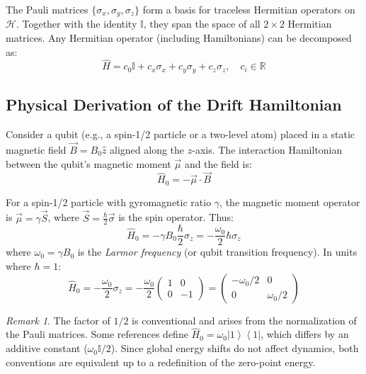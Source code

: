 \documentclass[11pt,a4paper]{article}
\theoremstyle{definition}
\theoremstyle{remark}
\newtheorem{remark}{Remark}[section]
\newcommand{\ket}[1]{\left|#1\right\rangle}
\newcommand{\bra}[1]{\left\langle#1\right|}
\newcommand{\paulix}{\sigma_x}
\newcommand{\pauliy}{\sigma_y}
\newcommand{\pauliz}{\sigma_z}
\newcommand{\identity}{\mathbb{I}}
\newcommand{\hilbert}{\mathcal{H}}
\newcommand{\RR}{\mathbb{R}}
\begin{document}
The Pauli matrices $\{\paulix, \pauliy, \pauliz\}$ form a basis for traceless Hermitian operators on $\hilbert$. Together with the identity $\identity$, they span the space of all $2 \times 2$ Hermitian matrices. Any Hermitian operator (including Hamiltonians) can be decomposed as:
\begin{equation}
\hat{H} = c_0 \identity + c_x \paulix + c_y \pauliy + c_z \pauliz, \quad c_i \in \RR
\end{equation}

\subsection{Physical Derivation of the Drift Hamiltonian}

Consider a qubit (e.g., a spin-1/2 particle or a two-level atom) placed in a static magnetic field $\vec{B} = B_0 \hat{z}$ aligned along the $z$-axis. The interaction Hamiltonian between the qubit's magnetic moment $\vec{\mu}$ and the field is:
\begin{equation}
\hat{H}_0 = -\vec{\mu} \cdot \vec{B}
\end{equation}

For a spin-1/2 particle with gyromagnetic ratio $\gamma$, the magnetic moment operator is $\vec{\mu} = \gamma \vec{S}$, where $\vec{S} = \frac{\hbar}{2} \vec{\sigma}$ is the spin operator. Thus:
\begin{equation}
\hat{H}_0 = -\gamma B_0 \frac{\hbar}{2} \sigma_z = -\frac{\omega_0}{2} \hbar \sigma_z
\end{equation}
where $\omega_0 = \gamma B_0$ is the \emph{Larmor frequency} (or qubit transition frequency). In units where $\hbar = 1$:
\begin{equation}
\hat{H}_0 = -\frac{\omega_0}{2} \sigma_z = -\frac{\omega_0}{2} \begin{pmatrix} 1 & 0 \\ 0 & -1 \end{pmatrix}
= \begin{pmatrix} -\omega_0/2 & 0 \\ 0 & \omega_0/2 \end{pmatrix}
\label{eq:drift_hamiltonian}
\end{equation}

\begin{remark}
The factor of $1/2$ is conventional and arises from the normalization of the Pauli matrices. Some references define $\hat{H}_0 = \omega_0 \ket{1}\bra{1}$, which differs by an additive constant ($\omega_0 \identity / 2$). Since global energy shifts do not affect dynamics, both conventions are equivalent up to a redefinition of the zero-point energy.
\end{remark}
\end{document}
